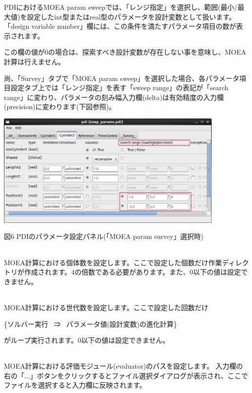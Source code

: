 \documentclass[a4paper,11pt]{jarticle}
\begin{document}
{\begin{description}
PDIにおけるMOEA param sweepでは、「レンジ指定」を選択し、範囲(最小/最大値)を設定したint型またはreal型のパラメータを設計変数として扱います。「design variable number」欄には、この条件を満たすパラメータ項目の数が表示されます。

この欄の値が0の場合は、探索すべき設計変数が存在しない事を意味し、MOEA計算は行えません。

尚、「Survey」タブで「MOEA param sweep」を選択した場合、各パラメータ項目設定タブ上では「レンジ指定」を表す「sweep range」の表記が「search range」に変わり、パラメータの刻み幅入力欄(delta)は有効精度の入力欄(precision)に変わります(下図参照)。

\begin{center}
\includegraphics[width=320pt, bb=0 0 856 429]{figs/fig006.png}

図6 PDIのパラメータ設定パネル(「MOEA param survey」選択時)
\end{center}

\item[population] {\ }\\
MOEA計算における個体数を設定します。ここで設定した個数だけ作業ディレクトリが作成されます。4の倍数である必要があります。また、0以下の値は設定できません。

\item[max generation] {\ }\\
MOEA計算における世代数を設定します。ここで設定した回数だけ\par
\begin{center}
\{ソルバー実行 \ ⇒ \ パラメータ値(設計変数)の進化計算\}
\end{center}\par
がループ実行されます。0以下の値は設定できません。

\item[evaluator path] {\ }\\
MOEA計算における評価モジュール(evaluator)のパスを設定します。
入力欄の右の「...」ボタンをクリックするとファイル選択ダイアログが表示され、ここでファイルを選択すると入力欄に反映されます。


\end{description}}
\end{document}
